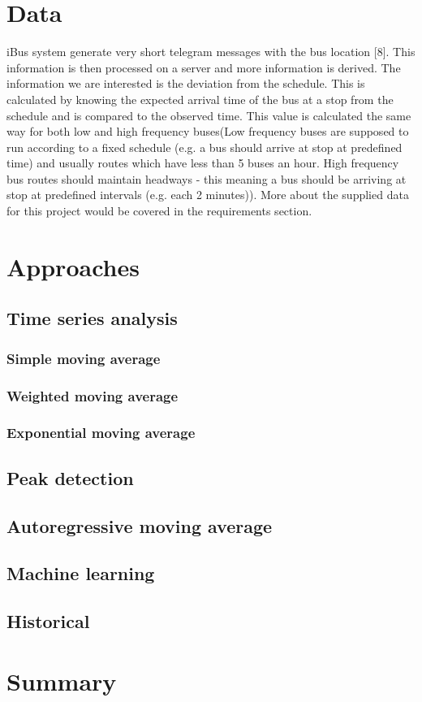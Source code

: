 \section{Data}
	iBus system generate very short telegram messages with the bus location [8].
This information is then processed on a server and more information is derived.
The information we are interested is the deviation from the schedule. This is
calculated by knowing the expected arrival time of the bus at a stop from
the schedule and is compared to the observed time. This value is calculated
the same way for both low and high frequency buses(Low frequency buses are
supposed to run according to a fixed schedule (e.g. a bus should arrive at stop
at predefined time) and usually routes which have less than 5 buses an hour.
High frequency bus routes should maintain headways - this meaning a bus
should be arriving at stop at predefined intervals (e.g. each 2 minutes)). More
about the supplied data for this project would be covered in the requirements
section.
\section{Approaches}
	\subsection{Time series analysis}
		\subsubsection{Simple moving average}
		\subsubsection{Weighted moving average}
		\subsubsection{Exponential moving average}
		\subsection{Peak detection}
		\subsection{Autoregressive moving average}
	\subsection{Machine learning}
	\subsection{Historical}
\section{Summary}